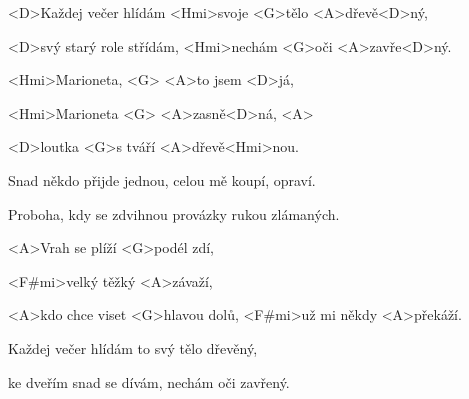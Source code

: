 
\zs
<D>Každej večer hlídám
<Hmi>svoje <G>tělo <A>dřevě<D>ný,

<D>svý starý role střídám,
<Hmi>nechám <G>oči <A>zavře<D>ný.
\ks

\zr
<Hmi>Marioneta, <G> <A>to jsem <D>já,

<Hmi>Marioneta <G> <A>zasně<D>ná, <A> 

<D>loutka <G>s tváří <A>dřevě<Hmi>nou.
\kr


\zs
Snad někdo přijde jednou,
celou mě koupí, opraví.

Proboha, kdy se zdvihnou
provázky rukou zlámaných.
\ks

\zr
\kr

\zs
<A>Vrah se plíží <G>podél zdí,

<F#mi>velký těžký <A>závaží,

<A>kdo chce viset <G>hlavou dolů,
<F#mi>už mi někdy <A>překáží.
\ks

\zs
Každej večer hlídám
to svý tělo dřevěný,

ke dveřím snad se dívám,
nechám oči zavřený.
\ks


\zr \kr
\kp
